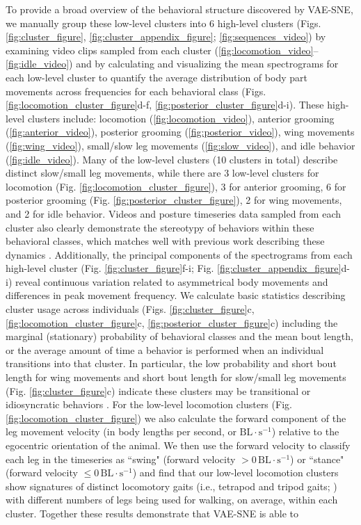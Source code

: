To provide a broad overview of the behavioral structure discovered by VAE-SNE, we manually group these low-level clusters into 6 high-level clusters (Figs. \ref{fig:cluster_figure}, \ref{fig:cluster_appendix_figure}; \ref{fig:sequences_video}) by examining video clips sampled from each cluster (\ref{fig:locomotion_video}--\ref{fig:idle_video}) and by calculating and visualizing the mean spectrograms for each low-level cluster to quantify the average distribution of body part movements across frequencies for each behavioral class (Figs. \ref{fig:locomotion_cluster_figure}d-f, \ref{fig:posterior_cluster_figure}d-i). These high-level clusters include: locomotion (\ref{fig:locomotion_video}), anterior grooming (\ref{fig:anterior_video}), posterior grooming (\ref{fig:posterior_video}), wing movements (\ref{fig:wing_video}), small/slow leg movements (\ref{fig:slow_video}), and idle behavior (\ref{fig:idle_video}). Many of the low-level clusters (10 clusters in total) describe distinct slow/small leg movements, while there are 3 low-level clusters for locomotion (Fig. \ref{fig:locomotion_cluster_figure}), 3 for anterior grooming, 6 for posterior grooming (Fig. \ref{fig:posterior_cluster_figure}), 2 for wing movements, and 2 for idle behavior. Videos and posture timeseries data sampled from each cluster also clearly demonstrate the stereotypy of behaviors within these behavioral classes, which matches well with previous work describing these dynamics \citep{berman2014mapping, berman2016predictability, klibaite2017unsupervised, klibaite2019interacting, pereira2019fast}. Additionally, the principal components of the spectrograms from each high-level cluster (Fig. \ref{fig:cluster_figure}f-i; Fig. \ref{fig:cluster_appendix_figure}d-i) reveal continuous variation related to asymmetrical body movements and differences in peak movement frequency. We calculate basic statistics describing cluster usage across individuals (Figs. \ref{fig:cluster_figure}c, \ref{fig:locomotion_cluster_figure}c, \ref{fig:posterior_cluster_figure}c) including the marginal (stationary) probability of behavioral classes and the mean bout length, or the average amount of time a behavior is performed when an individual transitions into that cluster. In particular, the low probability and short bout length for wing movements and short bout length for slow/small leg movements (Fig. \ref{fig:cluster_figure}c) indicate these clusters may be transitional or idiosyncratic behaviors \citep{todd2017systematic}. For the low-level locomotion clusters (Fig. \ref{fig:locomotion_cluster_figure}) we also calculate the forward component of the leg movement velocity (in body lengths per second, or $\textrm{BL} \cdot \textrm{s}^{-1}$) relative to the egocentric orientation of the animal. We then use the forward velocity to classify each leg in the timeseries as ``swing" (forward velocity $> 0 \, \textrm{BL} \cdot \textrm{s}^{-1}$) or ``stance" (forward velocity $\leq 0 \, \textrm{BL} \cdot \textrm{s}^{-1}$) and find that our low-level locomotion clusters show signatures of distinct locomotory gaits (i.e., tetrapod and tripod gaits; \citealt{mendes2013quantification, pereira2019fast}) with different numbers of legs being used for walking, on average, within each cluster. Together these results demonstrate that VAE-SNE is able to 